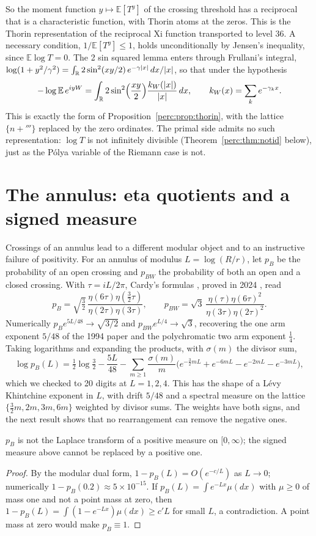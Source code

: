 So the moment function $y\mapsto\mathbb{E}[T^y]$ of the crossing threshold has a reciprocal that is a characteristic function, with Thorin atoms at the zeros. This is the Thorin representation of the reciprocal Xi function transported to level 36. A necessary condition, $1/\mathbb{E}[T^y]\le1$, holds unconditionally by Jensen's inequality, since $\mathbb{E}\log T = 0$. The 2 sin squared lemma enters through Frullani's integral, $\log(1+y^2/\gamma^2) = \int_{\mathbb{R}}2\sin^2(xy/2)\,e^{-\gamma|x|}\,dx/|x|$, so that under the hypothesis
\[
-\log\mathbb{E}\,e^{iyW} = \int_{\mathbb{R}}2\sin^2\!\Big(\frac{xy}{2}\Big)\frac{k_W(|x|)}{|x|}\,dx,\qquad k_W(x) = \sum_ke^{-\gamma_kx}.
\]
This is exactly the form of Proposition~\ref{perc:prop:thorin}, with the lattice $\{n+\third\}$ replaced by the zero ordinates. The primal side admits no such representation: $\log T$ is not infinitely divisible (Theorem~\ref{perc:thm:notid} below), just as the Pólya variable of the Riemann case is not.

\section{The annulus: eta quotients and a signed measure}

Crossings of an annulus lead to a different modular object and to an instructive failure of positivity. For an annulus of modulus $L = \log(R/r)$, let $p_B$ be the probability of an open crossing and $p_{BW}$ the probability of both an open and a closed crossing. With $\tau = iL/2\pi$, Cardy's formulas \cite{cardy2002,cardy2006}, proved in 2024 \cite{sxz2024}, read
\[
p_B = \sqrt{\tfrac32}\,\frac{\eta(6\tau)\eta(\tfrac32\tau)}{\eta(2\tau)\eta(3\tau)},\qquad
p_{BW} = \sqrt3\,\frac{\eta(\tau)\eta(6\tau)^2}{\eta(3\tau)\eta(2\tau)^2}.
\]
Numerically $p_Be^{5L/48}\to\sqrt{3/2}$ and $p_{BW}e^{L/4}\to\sqrt3$, recovering the one arm exponent $5/48$ of the 1994 paper and the polychromatic two arm exponent $\tfrac14$. Taking logarithms and expanding the products, with $\sigma(m)$ the divisor sum,
\[
\log p_B(L) = \tfrac12\log\tfrac32-\frac{5L}{48}-\sum_{m\ge1}\frac{\sigma(m)}{m}\Big(e^{-\frac32mL}+e^{-6mL}-e^{-2mL}-e^{-3mL}\Big),
\]
which we checked to 20 digits at $L = 1,2,4$. This has the shape of a Lévy Khintchine exponent in $L$, with drift $5/48$ and a spectral measure on the lattice $\{\tfrac32m,2m,3m,6m\}$ weighted by divisor sums. The weights have both signs, and the next result shows that no rearrangement can remove the negative ones.

\begin{proposition}\label{perc:prop:annulus}
$p_B$ is not the Laplace transform of a positive measure on $[0,\infty)$; the signed measure above cannot be replaced by a positive one.
\end{proposition}
\begin{proof}
By the modular dual form, $1-p_B(L) = O(e^{-c/L})$ as $L\to0$; numerically $1-p_B(0.2)\approx5\times10^{-15}$. If $p_B(L) = \int e^{-Lx}\mu(dx)$ with $\mu\ge0$ of mass one and not a point mass at zero, then $1-p_B(L) = \int(1-e^{-Lx})\mu(dx)\ge c'L$ for small $L$, a contradiction. A point mass at zero would make $p_B\equiv1$.
\end{proof}

